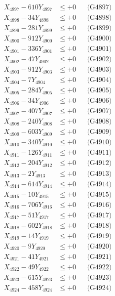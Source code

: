 \documentclass[a4paper,10pt]{article}
\begin{document}
{\begin{align}
X_{4897} - 610Y_{4897} &\leq +0 && \text{(G4897)} \\
X_{4898} - 34Y_{4898} &\leq +0 && \text{(G4898)} \\
X_{4899} - 281Y_{4899} &\leq +0 && \text{(G4899)} \\
X_{4900} - 912Y_{4900} &\leq +0 && \text{(G4900)} \\
\allowbreak
X_{4901} - 336Y_{4901} &\leq +0 && \text{(G4901)} \\
X_{4902} - 47Y_{4902} &\leq +0 && \text{(G4902)} \\
X_{4903} - 912Y_{4903} &\leq +0 && \text{(G4903)} \\
X_{4904} - 7Y_{4904} &\leq +0 && \text{(G4904)} \\
X_{4905} - 284Y_{4905} &\leq +0 && \text{(G4905)} \\
X_{4906} - 34Y_{4906} &\leq +0 && \text{(G4906)} \\
X_{4907} - 407Y_{4907} &\leq +0 && \text{(G4907)} \\
X_{4908} - 240Y_{4908} &\leq +0 && \text{(G4908)} \\
X_{4909} - 603Y_{4909} &\leq +0 && \text{(G4909)} \\
X_{4910} - 340Y_{4910} &\leq +0 && \text{(G4910)} \\
\allowbreak
X_{4911} - 126Y_{4911} &\leq +0 && \text{(G4911)} \\
X_{4912} - 204Y_{4912} &\leq +0 && \text{(G4912)} \\
X_{4913} - 2Y_{4913} &\leq +0 && \text{(G4913)} \\
X_{4914} - 614Y_{4914} &\leq +0 && \text{(G4914)} \\
X_{4915} - 10Y_{4915} &\leq +0 && \text{(G4915)} \\
X_{4916} - 706Y_{4916} &\leq +0 && \text{(G4916)} \\
X_{4917} - 51Y_{4917} &\leq +0 && \text{(G4917)} \\
X_{4918} - 602Y_{4918} &\leq +0 && \text{(G4918)} \\
X_{4919} - 14Y_{4919} &\leq +0 && \text{(G4919)} \\
X_{4920} - 9Y_{4920} &\leq +0 && \text{(G4920)} \\
\allowbreak
X_{4921} - 41Y_{4921} &\leq +0 && \text{(G4921)} \\
X_{4922} - 49Y_{4922} &\leq +0 && \text{(G4922)} \\
X_{4923} - 615Y_{4923} &\leq +0 && \text{(G4923)} \\
X_{4924} - 458Y_{4924} &\leq +0 && \text{(G4924)} \\

\end{align}}
\end{document}

